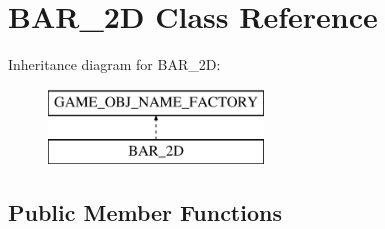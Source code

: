 \hypertarget{class_b_a_r__2_d}{
\section{BAR\_\-2D Class Reference}
\label{class_b_a_r__2_d}
}
Inheritance diagram for BAR\_\-2D:\begin{figure}[H]
\begin{center}
\leavevmode
\includegraphics[height=2.000000cm]{class_b_a_r__2_d}
\end{center}
\end{figure}
\subsection*{Public Member Functions}
